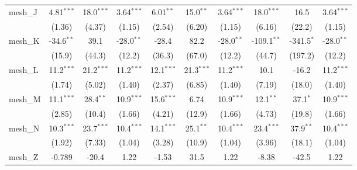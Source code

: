 \begin{tabular}{lccccccccc}
   mesh\_J                                                     & 4.81$^{***}$  & 18.0$^{***}$  & 3.64$^{***}$  & 6.01$^{**}$  & 15.0$^{**}$   & 3.64$^{***}$  & 18.0$^{***}$  & 16.5           & 3.64$^{***}$\\   
                                                               & (1.36)        & (4.37)        & (1.15)        & (2.54)       & (6.20)        & (1.15)        & (6.16)        & (22.2)         & (1.15)\\   
   mesh\_K                                                     & -34.6$^{**}$  & 39.1          & -28.0$^{**}$  & -28.4        & 82.2          & -28.0$^{**}$  & -109.1$^{**}$ & -341.5$^{*}$   & -28.0$^{**}$\\   
                                                               & (15.9)        & (44.3)        & (12.2)        & (36.3)       & (67.0)        & (12.2)        & (44.7)        & (197.2)        & (12.2)\\   
   mesh\_L                                                     & 11.2$^{***}$  & 21.2$^{***}$  & 11.2$^{***}$  & 12.1$^{***}$ & 21.3$^{***}$  & 11.2$^{***}$  & 10.1          & -16.2          & 11.2$^{***}$\\   
                                                               & (1.74)        & (5.02)        & (1.40)        & (2.37)       & (6.85)        & (1.40)        & (7.19)        & (18.0)         & (1.40)\\   
   mesh\_M                                                     & 11.1$^{***}$  & 28.4$^{**}$   & 10.9$^{***}$  & 15.6$^{***}$ & 6.74          & 10.9$^{***}$  & 12.1$^{**}$   & 37.1$^{*}$     & 10.9$^{***}$\\   
                                                               & (2.85)        & (10.4)        & (1.66)        & (4.21)       & (12.9)        & (1.66)        & (4.73)        & (19.8)         & (1.66)\\   
   mesh\_N                                                     & 10.3$^{***}$  & 23.7$^{***}$  & 10.4$^{***}$  & 14.1$^{***}$ & 25.1$^{**}$   & 10.4$^{***}$  & 23.4$^{***}$  & 37.9$^{**}$    & 10.4$^{***}$\\   
                                                               & (1.92)        & (7.33)        & (1.04)        & (3.28)       & (10.9)        & (1.04)        & (3.96)        & (18.1)         & (1.04)\\   
   mesh\_Z                                                     & -0.789        & -20.4         & 1.22          & -1.53        & 31.5          & 1.22          & -8.38         & -42.5          & 1.22\\   

\end{tabular}
